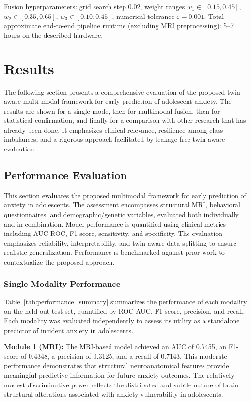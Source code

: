 \documentclass[10pt,letterpaper]{article}
\begin{document}
Fusion hyperparameters: grid search step 0.02, weight ranges $w_1 \in [0.15, 0.45]$, $w_2 \in [0.35, 0.65]$, $w_3 \in [0.10, 0.45]$, numerical tolerance $\varepsilon = 0.001$. Total approximate end-to-end pipeline runtime (excluding MRI preprocessing): 5--7 hours on the described hardware.

\section*{Results}
The following section presents a comprehensive evaluation of the proposed twin-aware multi modal framework for early prediction of adolescent anxiety. The results are shown for a single mode, then for multimodal fusion, then for statistical confirmation, and finally for a comparison with other research that has already been done. It emphasizes clinical relevance, resilience among class imbalances, and a rigorous approach facilitated by leakage-free twin-aware evaluation. 

\subsection*{Performance Evaluation}
This section evaluates the proposed multimodal framework for early prediction of anxiety in adolescents. The assessment encompasses structural MRI, behavioral questionnaires, and demographic/genetic variables, evaluated both individually and in combination. Model performance is quantified using clinical metrics including AUC-ROC, F1-score, sensitivity, and specificity. The evaluation emphasizes reliability, interpretability, and twin-aware data splitting to ensure realistic generalization. Performance is benchmarked against prior work to contextualize the proposed approach.

\subsubsection*{Single-Modality Performance}
Table~\ref{tab:performance_summary} summarizes the performance of each modality on the held-out test set, quantified by ROC-AUC, F1-score, precision, and recall. Each modality was evaluated independently to assess its utility as a standalone predictor of incident anxiety in adolescents.

\textbf{Module 1 (MRI):} The MRI-based model achieved an AUC of 0.7455, an F1-score of 0.4348, a precision of 0.3125, and a recall of 0.7143. This moderate performance demonstrates that structural neuroanatomical features provide meaningful predictive information for future anxiety outcomes. The relatively modest discriminative power reflects the distributed and subtle nature of brain structural alterations associated with anxiety vulnerability in adolescents.
\end{document}
